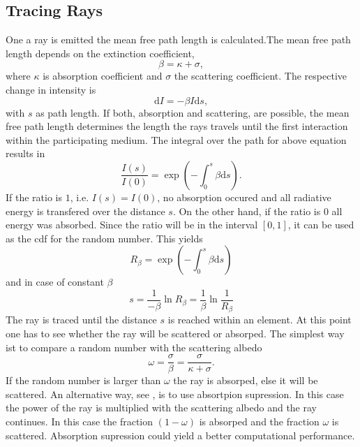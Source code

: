 \documentclass[a4paper,10pt]{scrartcl}
\begin{document}
\subsection{Tracing Rays}
One a ray is emitted the mean free path length is calculated.The mean free path length depends on the extinction coefficient,
\begin{equation}
 \beta = \kappa + \sigma ,
\end{equation}
where $\kappa$ is absorption coefficient and $\sigma$ the scattering coefficient. The respective change in intensity is
\begin{equation}
 \mathrm{d} I = -\beta I \mathrm{d}s,
\end{equation}
with $s$ as path length. If both, absorption and scattering, are possible, the mean free path length determines the length the rays travels until the first interaction within the participating medium.
The integral over the path for above equation results in
\begin{equation}
 \dfrac{I(s)}{I(0)} = \exp\left(-\int_0^s \beta \mathrm{d}s\right) .
\end{equation}
If the ratio is $1$, i.e. $I(s) = I(0)$, no absorption occured and all radiative energy is transfered over the distance $s$. On the other hand, if the ratio is $0$ all energy was absorbed. Since the ratio will be in the interval $[0,1]$, it can be used as the cdf for the random number. This yields
\begin{equation}
 R_\beta = \exp\left(-\int_0^s \beta \mathrm{d}s\right)
\end{equation}
and in case of constant $\beta$ 
\begin{equation}
 s = \dfrac{1}{-\beta} \ln R_\beta = \dfrac{1}{\beta} \ln \dfrac{1}{R_\beta}
\end{equation}
The ray is traced until the distance $s$ is reached within an element. At this point one has to see whether the ray will be scattered or absorped. The simplest way ist to compare a random number with the scattering albedo 
\begin{equation}
 \omega = \dfrac{\sigma}{\beta} = \dfrac{\sigma}{\kappa + \sigma} .
\end{equation}
If the random number is larger than $\omega$ the ray is absorped, else it will be scattered. An alternative way, see \cite[p. 365]{FH98}, is to use absortpion supression. In this case the power of the ray is multiplied with the scattering albedo and the ray continues. In this case the fraction $(1-\omega)$ is absorped and the fraction $\omega$ is scattered. Absorption supression could yield a better computational performance.  




\end{document}
